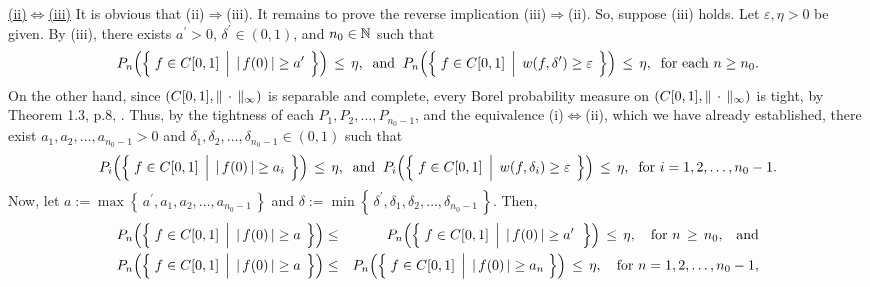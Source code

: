 \vskip 0.5cm
\noindent
\underline{(ii)\;$\Longleftrightarrow$\;(iii)}
\vskip 0.2cm
\noindent
It is obvious that (ii)\;$\Longrightarrow$\;(iii).
It remains to prove the reverse implication (iii)\;$\Longrightarrow$\;(ii).
So, suppose (iii) holds. Let $\varepsilon, \eta > 0$ be given.
By (iii), there exists $a^{\prime} > 0$, $\delta^{\prime} \in (0,1)$, and $n_{0} \in \mathbb{N}$ such that
\begin{equation*}
	P_{n}\!\left(\left\{\;
		f \in \Czo
		\;\left\vert\;\,
		\vert\,f(0)\,\vert \overset{{\color{white}.}}{\geq} a^{\prime}
		\right.
	\;\right\}\right)
	\,\leq\, \eta,
	\;\;\textnormal{and}\;\;
	P_{n}\!\left(\left\{\;
		f \in \Czo
		\;\left\vert\;\,
		w(f,\delta^{\prime}) \overset{{\color{white}.}}{\geq} \varepsilon
		\right.
	\;\right\}\right)
	\,\leq\, \eta,
	\;\;
	\textnormal{for each $n \geq n_{0}$}.
\end{equation*}
On the other hand, since $\left(C[0,1],\Vert\,\cdot\,\Vert_{\infty}\right)$ is separable and complete,
every Borel probability measure on $\left(C[0,1],\Vert\,\cdot\,\Vert_{\infty}\right)$ is tight, by
Theorem 1.3, p.8, \cite{Billingsley1999}.
Thus, by the tightness of each $P_{1}, P_{2}, \ldots, P_{n_{0}-1}$, and
the equivalence (i)\;$\Longleftrightarrow$\;(ii), which we have already established, there exist
$a_{1}, a_{2}, \ldots, a_{n_{0}-1} > 0$ and $\delta_{1}, \delta_{2}, \ldots, \delta_{n_{0}-1} \in (0,1)$
such that
\begin{equation*}
	P_{i}\!\left(\left\{\;
		f \in \Czo
		\;\left\vert\;\,
		\vert\,f(0)\,\vert \overset{{\color{white}.}}{\geq} a_{i}
		\right.
	\;\right\}\right)
	\,\leq\, \eta,
	\;\;\textnormal{and}\;\;
	P_{i}\!\left(\left\{\;
		f \in \Czo
		\;\left\vert\;\,
		w(f,\delta_{i}) \overset{{\color{white}.}}{\geq} \varepsilon
		\right.
	\;\right\}\right)
	\,\leq\, \eta,
	\;\;
	\textnormal{for $i = 1, 2, \ldots, n_{0}-1$}.
\end{equation*}
Now, let $a := \max\left\{\,a^{\prime},a_{1},a_{2},\ldots,a_{n_{0}-1}\,\right\}$ and
$\delta := \min\left\{\,\delta^{\prime},\delta_{1},\delta_{2},\ldots,\delta_{n_{0}-1}\,\right\}$.
Then,
\begin{eqnarray*}
P_{n}\!\left(\left\{\;
	f \in \Czo
	\;\left\vert\;\,
	\vert\,f(0)\,\vert \overset{{\color{white}.}}{\geq} a
	\right.
\;\right\}\right)
&\leq&
	P_{n}\!\left(\left\{\;
		f \in \Czo
		\;\left\vert\;\,
		\vert\,f(0)\,\vert \overset{{\color{white}.}}{\geq} a^{\prime}
		\right.
	\,\;\right\}\right)
	\,\leq\, \eta,
	\quad\textnormal{for $n \,\geq\, n_{0}$,\quad and}
\\
P_{n}\!\left(\left\{\;
	f \in \Czo
	\;\left\vert\;\,
	\vert\,f(0)\,\vert \overset{{\color{white}.}}{\geq} a
	\right.
\;\right\}\right)
&\leq&
	P_{n}\!\left(\left\{\;
		f \in \Czo
		\;\left\vert\;\,
		\vert\,f(0)\,\vert \overset{{\color{white}.}}{\geq} a_{n}
		\,\right.
	\right\}\right)
	\,\leq\, \eta,
	\quad\textnormal{for $n = 1, 2, \ldots, n_{0}-1$},
\end{eqnarray*}
